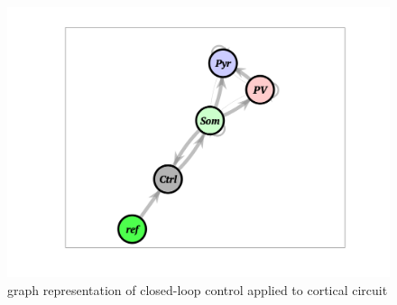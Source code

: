 \begin{figure}[h]
    \centering
    \includegraphics[width=\textwidth/2]{cl_graph.png}
    \caption{graph representation of closed-loop control applied to cortical circuit}
\end{figure}

